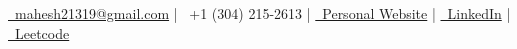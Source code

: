 \documentclass[]{resume-openfont}
\begin{document}
%
%
\lastupdated
{}
%
%
{ 
\href{mailto:mahesh21319@gmail.com}{\faEnvelope \, mahesh21319@gmail.com} |
\faPhone \, +1 (304) 215-2613 |
\href{https://mahesh-maddhuru.github.io/}{\faUserTie \, Personal Website} |
\href{http://www.linkedin.com/in/mahesh-m97}{\faLinkedin \, LinkedIn} |
\href{https://leetcode.com/mahm/}{\faCode \, Leetcode}
}

%
%
\end{document}
